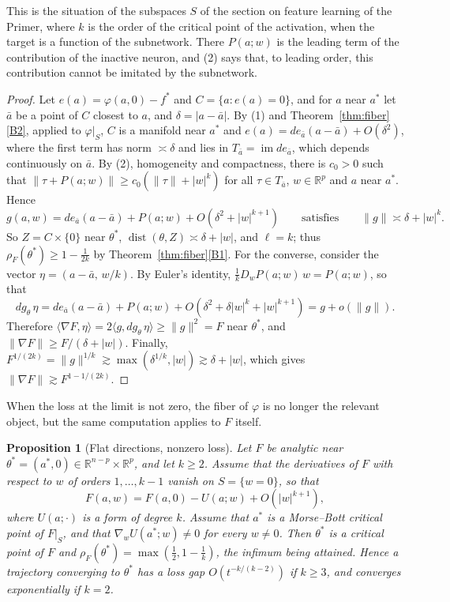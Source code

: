 \documentclass[11pt]{article}
\newtheorem{proposition}[lemma]{Proposition}
\theoremstyle{definition}
\theoremstyle{remark}
\newcommand{\R}{\mathbb{R}}
\newcommand{\ip}[2]{\langle #1,#2\rangle}
\DeclareMathOperator{\dist}{dist}
\DeclareMathOperator{\im}{im}
\begin{document}
This is the situation of the subspaces $S$ of the section on feature learning of the Primer, where $k$ is the order of the critical point of the activation, when the target is a function of the subnetwork. There $P(a;w)$ is the leading term of the contribution of the inactive neuron, and (2) says that, to leading order, this contribution cannot be imitated by the subnetwork.

\begin{proof}
Let $e(a)=\varphi(a,0)-f^*$ and $C=\{a:e(a)=0\}$, and for $a$ near $a^*$ let $\bar a$ be a point of $C$ closest to $a$, and $\delta=|a-\bar a|$. By (1) and Theorem~\ref{thm:fiber}\ref{B2}, applied to $\varphi|_S$, $C$ is a manifold near $a^*$ and $e(a)=de_{\bar a}(a-\bar a)+O(\delta^2)$, where the first term has norm $\asymp\delta$ and lies in $T_{\bar a}=\im de_{\bar a}$, which depends continuously on $\bar a$. By (2), homogeneity and compactness, there is $c_0>0$ such that $\|\tau+P(a;w)\|\ge c_0(\|\tau\|+|w|^k)$ for all $\tau\in T_{\bar a}$, $w\in\R^p$ and $a$ near $a^*$. Hence
\[
g(a,w)=de_{\bar a}(a-\bar a)+P(a;w)+O(\delta^2+|w|^{k+1})\qquad\text{satisfies}\qquad\|g\|\asymp\delta+|w|^k .
\]
So $Z=C\times\{0\}$ near $\theta^*$, $\dist(\theta,Z)\asymp\delta+|w|$, and $\ell=k$; thus $\rho_F(\theta^*)\ge1-\frac1{2k}$ by Theorem~\ref{thm:fiber}\ref{B1}. For the converse, consider the vector $\eta=(a-\bar a,\,w/k)$. By Euler's identity, $\frac1kD_wP(a;w)\,w=P(a;w)$, so that
\[
dg_\theta\,\eta=de_{\bar a}(a-\bar a)+P(a;w)+O(\delta^2+\delta|w|^k+|w|^{k+1})=g+o(\|g\|).
\]
Therefore $\ip{\nabla F}{\eta}=2\ip{g}{dg_\theta\,\eta}\ge\|g\|^2=F$ near $\theta^*$, and $\|\nabla F\|\ge F/(\delta+|w|)$. Finally, $F^{1/(2k)}=\|g\|^{1/k}\gtrsim\max(\delta^{1/k},|w|)\gtrsim\delta+|w|$, which gives $\|\nabla F\|\gtrsim F^{1-1/(2k)}$.
\end{proof}

When the loss at the limit is not zero, the fiber of $\varphi$ is no longer the relevant object, but the same computation applies to $F$ itself.

\begin{proposition}[Flat directions, nonzero loss]\label{prop:spurious}
Let $F$ be analytic near $\theta^*=(a^*,0)\in\R^{n-p}\times\R^p$, and let $k\ge2$. Assume that the derivatives of $F$ with respect to $w$ of orders $1,\dots,k-1$ vanish on $S=\{w=0\}$, so that
\[
F(a,w)=F(a,0)-U(a;w)+O(|w|^{k+1}),
\]
where $U(a;\cdot)$ is a form of degree $k$. Assume that $a^*$ is a Morse--Bott critical point of $F|_S$, and that $\nabla_wU(a^*;w)\ne0$ for every $w\ne0$. Then $\theta^*$ is a critical point of $F$ and $\rho_F(\theta^*)=\max(\frac12,1-\frac1k)$, the infimum being attained. Hence a trajectory converging to $\theta^*$ has a loss gap $O(t^{-k/(k-2)})$ if $k\ge3$, and converges exponentially if $k=2$.
\end{proposition}
\end{document}
